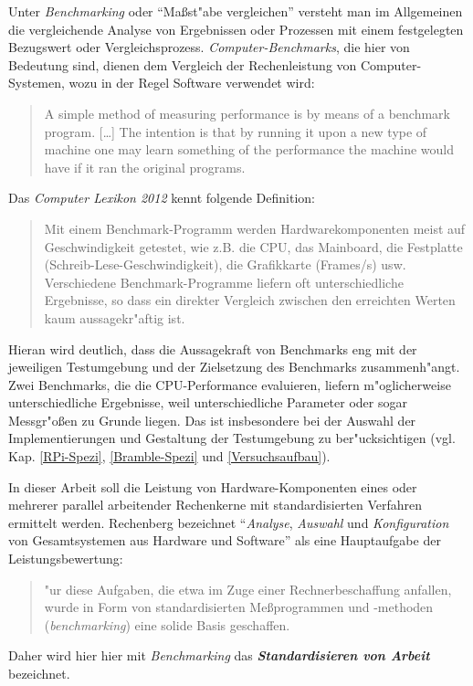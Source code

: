 Unter \textit{Benchmarking} oder "`Ma\ss st"abe vergleichen"' versteht man im Allgemeinen die vergleichende Analyse von Ergebnissen oder Prozessen mit einem festgelegten Bezugswert oder Vergleichsprozess. \textit{Computer-Benchmarks}, die hier von Bedeutung sind, dienen dem Vergleich der Rechenleistung von Computer-Systemen, wozu in der Regel Software verwendet wird:
\begin{quote}
\onehalfspacing
A simple method of measuring performance is by means of a benchmark program. [\dots] The intention is that by running it upon a new type of machine one may learn something of the performance the machine would have if it ran the original programs. \cite{cur76}
\end{quote}
Das \textit{Computer Lexikon 2012} kennt folgende Definition: 
\begin{quote}
\onehalfspacing
Mit einem Benchmark-Programm werden Hardwarekomponenten meist auf Geschwindigkeit getestet, wie z.B. die CPU, das Mainboard, die Festplatte (Schreib-Lese-Geschwindigkeit), die Grafikkarte (Frames/s) usw. Verschiedene Benchmark-Programme liefern oft unterschiedliche Ergebnisse, so dass ein direkter Vergleich zwischen den erreichten Werten kaum aussagekr"aftig ist. \cite{pre11}
\end{quote}
Hieran wird deutlich, dass die Aussagekraft von Benchmarks eng mit der jeweiligen Testumgebung und der Zielsetzung des Benchmarks zusammenh"angt. Zwei Benchmarks, die die CPU-Performance evaluieren, liefern m"oglicherweise unterschiedliche Ergebnisse, weil unterschiedliche Parameter oder sogar Messgr"o\ss en zu Grunde liegen. Das ist insbesondere bei der Auswahl der Implementierungen und Gestaltung der Testumgebung zu ber"ucksichtigen (vgl. Kap. \ref{RPi-Spezi}, \ref{Bramble-Spezi} und \ref{Versuchsaufbau}). 

In dieser Arbeit soll die Leistung von Hardware-Komponenten eines oder mehrerer parallel arbeitender Rechenkerne mit standardisierten Verfahren ermittelt werden. Rechenberg bezeichnet "`\textit{Analyse}, \textit{Auswahl} und \textit{Konfiguration} von Gesamtsystemen aus Hardware und Software"' \cite{rec06} als eine Hauptaufgabe der Leistungsbewertung: 
\begin{quote}
\onehalfspacing
[F]"ur diese Aufgaben, die etwa im Zuge einer Rechnerbeschaffung anfallen, wurde in Form von standardisierten Me\ss programmen und -methoden (\textit{benchmarking}) eine solide Basis geschaffen. \cite{rec06}
\end{quote} 
Daher wird hier hier mit \textit{Benchmarking} das \textbf{\textit{Standardisieren von Arbeit}} bezeichnet.

